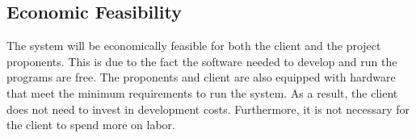 \subsection{Economic Feasibility}
The system will be economically feasible for both the client and the project proponents. This is due to the fact the software needed to develop and run the programs are free. The proponents and client are also equipped with hardware that meet the minimum requirements to run the system. As a result, the client does not need to invest in development costs. Furthermore, it is not necessary for the client to spend more on labor.